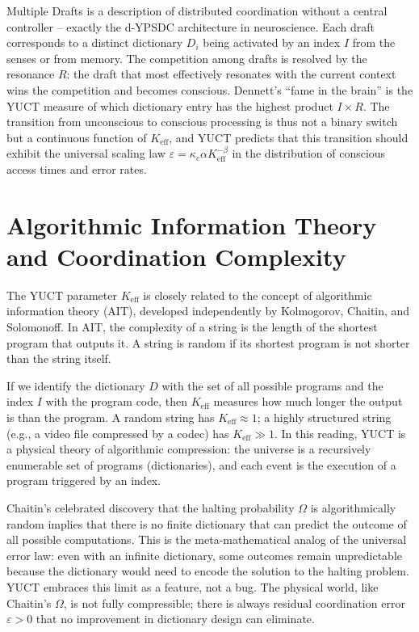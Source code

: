 \documentclass[12pt,a4paper]{article}
\begin{document}
	Multiple Drafts is a description of distributed coordination without a central controller -- exactly the d-YPSDC architecture in neuroscience. Each draft corresponds to a distinct dictionary \(D_i\) being activated by an index \(I\) from the senses or from memory. The competition among drafts is resolved by the resonance \(R\): the draft that most effectively resonates with the current context wins the competition and becomes conscious. Dennett's ``fame in the brain'' is the YUCT measure of which dictionary entry has the highest product \(I \times R\). The transition from unconscious to conscious processing is thus not a binary switch but a continuous function of \(K_{\mathrm{eff}}\), and YUCT predicts that this transition should exhibit the universal scaling law \(\varepsilon = \kappa_c \alpha K_{\mathrm{eff}}^{-\beta}\) in the distribution of conscious access times and error rates.
	
	\section{Algorithmic Information Theory and Coordination Complexity}
	
	The YUCT parameter \(K_{\mathrm{eff}}\) is closely related to the concept of algorithmic information theory (AIT), developed independently by Kolmogorov, Chaitin, and Solomonoff. In AIT, the complexity of a string is the length of the shortest program that outputs it. A string is random if its shortest program is not shorter than the string itself.
	
	If we identify the dictionary \(D\) with the set of all possible programs and the index \(I\) with the program code, then \(K_{\mathrm{eff}}\) measures how much longer the output is than the program. A random string has \(K_{\mathrm{eff}} \approx 1\); a highly structured string (e.g., a video file compressed by a codec) has \(K_{\mathrm{eff}} \gg 1\). In this reading, YUCT is a physical theory of algorithmic compression: the universe is a recursively enumerable set of programs (dictionaries), and each event is the execution of a program triggered by an index.
	
	Chaitin's celebrated discovery that the halting probability \(\Omega\) is algorithmically random implies that there is no finite dictionary that can predict the outcome of all possible computations. This is the meta-mathematical analog of the universal error law: even with an infinite dictionary, some outcomes remain unpredictable because the dictionary would need to encode the solution to the halting problem. YUCT embraces this limit as a feature, not a bug. The physical world, like Chaitin's \(\Omega\), is not fully compressible; there is always residual coordination error \(\varepsilon > 0\) that no improvement in dictionary design can eliminate.
	
\end{document}
